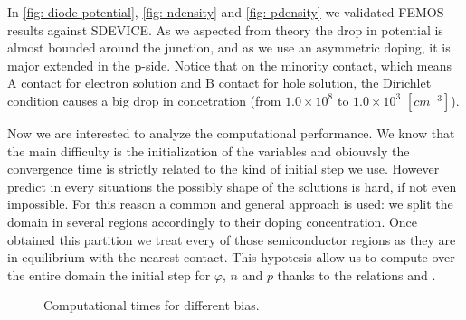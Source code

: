 \begin{figure}[!t]
\centering
{}
\hspace{1cm}
\label{fig: diodo struttura}
\end{figure}


In \ref{fig: diode potential}, \ref{fig: ndensity} and \ref{fig: pdensity} we validated FEMOS results against SDEVICE. As we aspected from theory the drop in potential is almost bounded around the junction, and as we use an asymmetric doping, it is major extended in the p-side. Notice that on the minority contact, which means A contact for electron solution and B contact for hole solution, the Dirichlet condition causes a big drop in concetration (from $1.0\times 10^{8}$ to $1.0 \times 10^3$ $[cm^{-3}]$). 

Now we are interested to analyze the computational performance. We know that the main difficulty is the initialization of the variables and obiouvsly the convergence time is strictly related to the kind of initial step we use. However predict in every situations the possibly shape of the solutions is hard, if not even impossible. For this reason a common and general approach is used: we split the domain in several regions accordingly to their doping concentration. Once obtained this partition we treat every of those semiconductor regions as they are in equilibrium with the nearest contact. This hypotesis allow us to compute over the entire domain the initial step for $\varphi$, $n$ and $p$ thanks to the relations  and . 


\begin{figure}[!h]
\centering
{}
\caption{Computational times for different bias.}
\end{figure}

